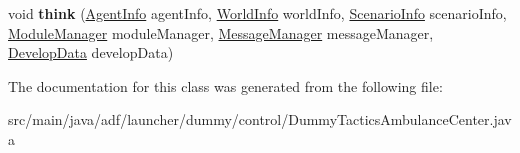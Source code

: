 \begin{DoxyCompactItemize}
\item 
\hypertarget{classadf_1_1launcher_1_1dummy_1_1control_1_1DummyTacticsAmbulanceCenter_af6dbefc0ad86950c245ce54bb415c435}{}\label{classadf_1_1launcher_1_1dummy_1_1control_1_1DummyTacticsAmbulanceCenter_af6dbefc0ad86950c245ce54bb415c435} 
void {\bfseries think} (\hyperlink{classadf_1_1agent_1_1info_1_1AgentInfo}{Agent\+Info} agent\+Info, \hyperlink{classadf_1_1agent_1_1info_1_1WorldInfo}{World\+Info} world\+Info, \hyperlink{classadf_1_1agent_1_1info_1_1ScenarioInfo}{Scenario\+Info} scenario\+Info, \hyperlink{classadf_1_1agent_1_1module_1_1ModuleManager}{Module\+Manager} module\+Manager, \hyperlink{classadf_1_1agent_1_1communication_1_1MessageManager}{Message\+Manager} message\+Manager, \hyperlink{classadf_1_1agent_1_1develop_1_1DevelopData}{Develop\+Data} develop\+Data)
\end{DoxyCompactItemize}


The documentation for this class was generated from the following file\+:\begin{DoxyCompactItemize}
\item 
src/main/java/adf/launcher/dummy/control/Dummy\+Tactics\+Ambulance\+Center.\+java\end{DoxyCompactItemize}
